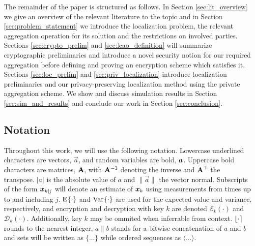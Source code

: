 \documentclass[10pt,letterpaper,oneside,twocolumn,journal]{IEEEtran}
\theoremstyle{definition}
\theoremstyle{definition}
\theoremstyle{remark}
\begin{document}
The remainder of the paper is structured as follows. In Section \ref{sec:lit_overview} we give an overview of the relevant literature to the topic and in Section \ref{sec:problem_statement} we introduce the localization problem, the relevant aggregation operation for its solution and the restrictions on involved parties. Sections \ref{sec:crypto_prelim} and \ref{sec:lcao_definition} will summarize cryptographic preliminaries and introduce a novel security notion for our required aggregation before defining and proving an encryption scheme which satisfies it. Sections \ref{sec:loc_prelim} and \ref{sec:priv_localization} introduce localization preliminaries and our privacy-preserving localization method using the private aggregation scheme. We show and discuss simulation results in Section \ref{sec:sim_and_results} and conclude our work in Section \ref{sec:conclusion}.

% 
% 

\subsection{Notation}
Throughout this work, we will use the following notation. Lowercase underlined characters are vectors, $\vec{a}$, and random variables are bold, ${\boldsymbol{a}}$. Uppercase bold characters are matrices, ${{\mathbf{A}}}$, with ${{\mathbf{A}}}^{-1}$ denoting the inverse and ${{\mathbf{A}}}^\top$ the transpose. $|a|$ is the absolute value of $a$ and $\lVert\vec{a}\rVert$ the vector normal. Subscripts of the form ${\boldsymbol{x}}_{k|j}$ will denote an estimate of ${\boldsymbol{x}}_k$ using measurements from times up to and including $j$. $\E{\cdot}$ and $\Var{\cdot}$ are used for the expected value and variance, respectively, and encryption and decryption with key $k$ are denoted $\mathcal{E}_{k}(\cdot)$ and $\mathcal{D}_{k}(\cdot)$. Additionally, key $k$ may be ommited when inferrable from context. $\lfloor\cdot\rceil$ rounds to the nearest integer, $a\|b$ stands for a bitwise concatenation of $a$ and $b$ and sets will be written as $\{\dots\}$ while ordered sequences as $\langle\dots\rangle$.
\end{document}
